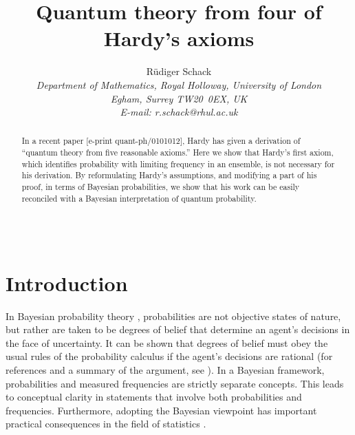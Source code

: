 \documentclass[pra,12pt,tightenlines]{revtex4}
\begin{document}
\def\ket#1{|#1\rangle}
\def\bra#1{\langle#1|}
\def\tr{{\rm tr}}
\def\p{{\bf p}}
\def\yes{{\rm yes}}

\newcommand{\vc}[2]{\left(\begin{array}{c}{\!\!#1\!\!}\\{\!\!#2\!\!}\end{array}\right)}

\title{Quantum theory from four of Hardy's axioms}

\author{R\"udiger Schack \\
\it Department of Mathematics, Royal Holloway, University of London \\ 
Egham, Surrey TW20~0EX, UK \\ 
E-mail: r.schack@rhul.ac.uk \\
$\;$ \\ $\;$}

\begin{abstract}
  In a recent paper [e-print quant-ph/0101012], Hardy has given a derivation
  of ``quantum theory from five reasonable axioms.'' Here we show that Hardy's
  first axiom, which identifies probability with limiting frequency in an
  ensemble, is not necessary for his derivation.  By reformulating Hardy's
  assumptions, and modifying a part of his proof, in terms of Bayesian
  probabilities, we show that his work can be easily reconciled with a Bayesian
  interpretation of quantum probability.
\end{abstract}

\pacs{}

\maketitle

$\;$ \section{Introduction}

In Bayesian probability theory \cite{Bernardo1994,Kyburg1980}, probabilities
are not objective states of nature, but rather are taken to be degrees of
belief that determine an agent's decisions in the face of uncertainty.
It can be shown that degrees of belief must obey the usual rules of the
probability calculus if the agent's decisions are rational (for
references and a summary of the argument, see \cite{Caves2002a}). In a Bayesian
framework, probabilities and measured frequencies are strictly separate
concepts. This leads to conceptual clarity in statements that involve both
probabilities and frequencies. Furthermore, adopting the Bayesian viewpoint
has important practical consequences in the field of statistics
\cite{Bernardo1994,Malakoff1999}.
\end{document}
